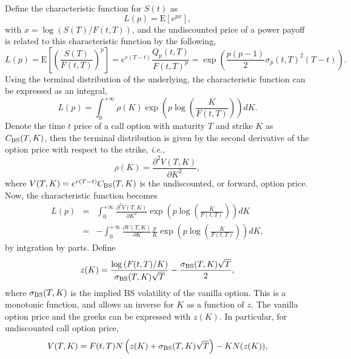 \documentclass[12pt]{article}
\begin{document}
    Define the characteristic function for $S(t)$ as
    \begin{equation}
      L(p)={\mathrm E}[e^{px}],
    \end{equation}
    with $x=\log(S(T)/F(t,T))$, and the undiscounted price of a power payoff is related to this characteristic function by the
    following,
    \begin{equation}
      L(p)={\mathrm E}\left[\left(\frac{S(T)}{F(t,T)}\right)^p\right]=e^{r(T-t)}\frac{Q_p(t,T)}{F(t,T)^p}
          =\exp\left(\frac{p(p-1)}{2}\sigma_p(t,T)^2(T-t)\right).
    \end{equation}
    Using the terminal distribution of the underlying, the characteristic function can be expressed as an integral,
    \begin{equation}
      L(p)=\int_0^{+\infty}\rho(K)\exp\left(p\log\left(\frac{K}{F(t,T)}\right)\right)dK.
    \end{equation}
    Denote the time $t$ price of a call option with maturity $T$ and strike $K$ as $C_{{\rm BS}}(T,K)$,
    then the terminal distribution is given by the second derivative of the option price with respect to the strike, {\it i.e.},
    \begin{equation}
      \rho(K)=\frac{\partial^2V(T,K)}{\partial K^2},
    \end{equation}
    where $V(T,K) = e^{r(T-t)}C_{{\rm BS}}(T,K)$ is the undiscounted, or forward, option price. Now, the characteristic function becomes
    \begin{eqnarray}
      L(p) &=& \int_0^{+\infty}\frac{\partial^2V(T,K)}{\partial K^2}\exp\left(p\log\left(\frac{K}{F(t,T)}\right)\right)dK \nonumber \\
           &=& - \int_0^{+\infty}\frac{\partial V(T,K)}{\partial K }\frac{p}{K}\exp\left(p\log\left(\frac{K}{F(t,T)}\right)\right)dK,
    \end{eqnarray}
    by intgration by parts. Define
    \begin{equation}
      z(K)=\frac{\log\left(F(t,T)/K\right)}{\sigma_{{\rm BS}}(T,K)\sqrt{T}}-\frac{\sigma_{{\rm BS}}(T,K)\sqrt{T}}{2},
    \end{equation}
    where $\sigma_{{\rm BS}}(T,K)$ is the implied BS volatility of the vanilla option. This is a monotonic function, and allows an
    inverse for $K$ as a function of $z$. The vanilla option price and the greeks can be expressed with $z(K)$. In particular, for undiscounted
    call option price,
    \begin{equation}
      V(T,K) =  F(t,T)N\left(z(K)+\sigma_{{\rm BS}}(T,K)\sqrt{T}\right) - KN(z(K)),
    \end{equation}
\end{document}
